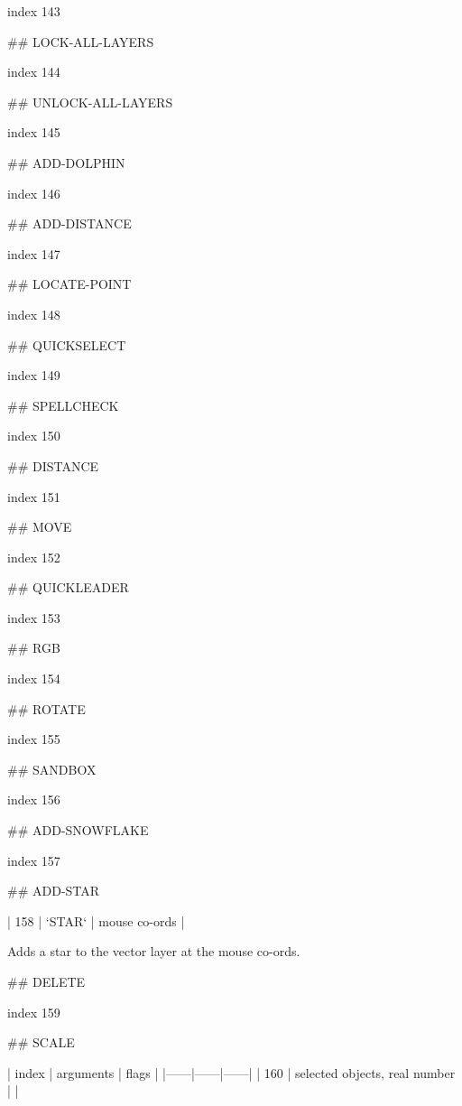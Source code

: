 index 143



## LOCK-ALL-LAYERS

index 144



## UNLOCK-ALL-LAYERS

index 145



## ADD-DOLPHIN

index 146



## ADD-DISTANCE

index 147



## LOCATE-POINT

index 148



## QUICKSELECT

index 149



## SPELLCHECK

index 150



## DISTANCE

index 151



## MOVE

index 152



## QUICKLEADER

index 153



## RGB

 index 154



## ROTATE

index 155



## SANDBOX

index 156



## ADD-SNOWFLAKE

index 157



## ADD-STAR

| 158 | `STAR` | mouse co-ords |

Adds a star to the vector layer at the mouse co-ords.

## DELETE

index 159



## SCALE

| index | arguments | flags |
|------|------|------|
| 160 | selected objects, real number | |

